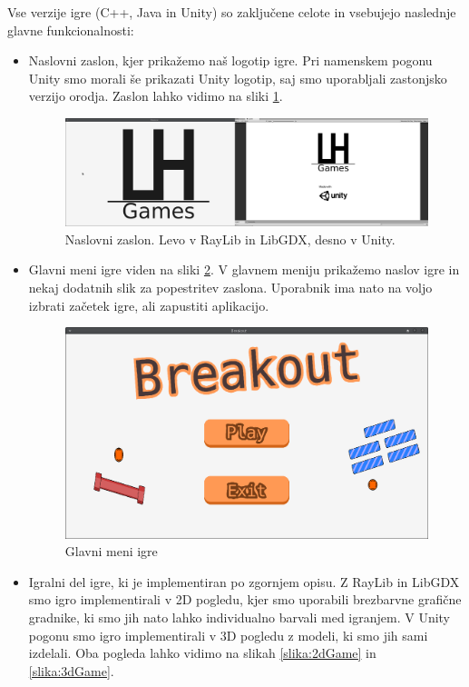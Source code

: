 \documentclass[12pt,a4paper,twoside]{book}
\begin{document}
Vse verzije igre (C++, Java in Unity) so zaključene celote in vsebujejo naslednje glavne funkcionalnosti:
\begin{itemize}
\item Naslovni zaslon, kjer prikažemo naš logotip igre. Pri namenskem pogonu Unity smo morali še prikazati Unity logotip, saj smo uporabljali zastonjsko verzijo orodja. Zaslon lahko vidimo na sliki \ref{slika:naslovniZaslon}.
\begin{figure}[h]
	\centering
	\includegraphics[width=14cm]{titleScreen}
	\caption{Naslovni zaslon. Levo v RayLib in LibGDX, desno v Unity.}
	\label{slika:naslovniZaslon}
\end{figure}
\item Glavni meni igre viden na sliki \ref{slika:mainMenu}. V glavnem meniju prikažemo naslov igre in nekaj dodatnih slik za popestritev zaslona. Uporabnik ima nato na voljo izbrati začetek igre, ali zapustiti aplikacijo.
\begin{figure}[h]
	\centering
	\includegraphics[width=14cm]{mainMenu}
	\caption{Glavni meni igre}
	\label{slika:mainMenu}
\end{figure}
\item Igralni del igre, ki je implementiran po zgornjem opisu. Z RayLib in LibGDX smo igro implementirali v 2D pogledu, kjer smo uporabili brezbarvne grafične gradnike, ki smo jih nato lahko individualno barvali med igranjem. V Unity pogonu smo igro implementirali v 3D pogledu z modeli, ki smo jih sami izdelali. Oba pogleda lahko vidimo na slikah \ref{slika:2dGame} in \ref{slika:3dGame}.

\end{itemize}
\end{document}
